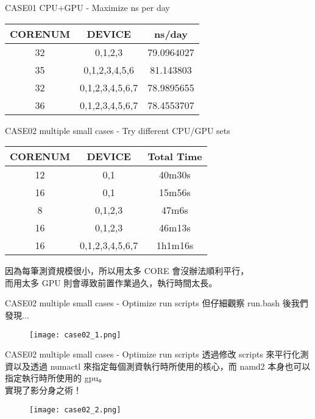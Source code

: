 \documentclass[aspectratio=169]{beamer}
\begin{document}
    \begin{frame}{CASE01 CPU+GPU - Maximize ns per day}
        \begin{center}
        \begin{longtable}{|c|c|c|}
        \hline
        \textbf{CORENUM} & \textbf{DEVICE} & \textbf{ns/day} \\
        \hline
        32 & 0,1,2,3 & 79.0964027 \\
        \hline
        35 & 0,1,2,3,4,5,6 & 81.143803 \\
        \hline
        32 & 0,1,2,3,4,5,6,7 & 78.9895655 \\
        \hline
        36 & 0,1,2,3,4,5,6,7 & 78.4553707 \\
        \hline
        \end{longtable}
        \end{center} 
    \end{frame}
    
    \begin{frame}{CASE02 multiple small cases - Try different CPU/GPU sets}
        \begin{longtable}{|c|c|c|}
        \hline
        \textbf{CORENUM} & \textbf{DEVICE} & \textbf{Total Time} \\
        \hline
        12 & 0,1 & 40m30s \\
        \hline
        16 & 0,1 & 15m56s \\
        \hline
        8 & 0,1,2,3 & 47m6s \\
        \hline
        16 & 0,1,2,3 & 46m13s \\
        \hline
        16 & 0,1,2,3,4,5,6,7 & 1h1m16s \\
        \hline
        \end{longtable}
        因為每筆測資規模很小，所以用太多 CORE 會沒辦法順利平行，\\
        而用太多 GPU 則會導致前置作業過久，執行時間太長。
    \end{frame}

    
    \begin{frame}{CASE02 multiple small cases - Optimize run scripts}
        但仔細觀察 run.bash 後我們發現...
        \begin{figure}
            \centering
            \texttt{[image: case02\_1.png]}
            \label{fig:enter-label}
        \end{figure}
    \end{frame}

    
    \begin{frame}{CASE02 multiple small cases - Optimize run scripts}
        透過修改 scripts 來平行化測資以及透過 numactl 來指定每個測資執行時所使用的核心，而 namd2 本身也可以指定執行時所使用的 gpu。 \\
        實現了影分身之術！
        \begin{figure}
            \centering
            \texttt{[image: case02\_2.png]}
            \label{fig:enter-label}
        \end{figure}
    \end{frame}
    
\end{document}
